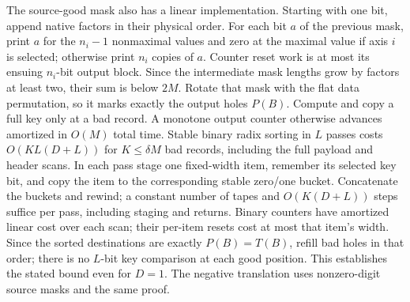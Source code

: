 The source-good mask also has a linear implementation. Starting with
one bit, append native factors in their physical order. For each bit
$a$ of the previous mask, print $a$ for the $n_i-1$ nonmaximal values
and zero at the maximal value if axis $i$ is selected; otherwise
print $n_i$ copies of $a$. Counter reset work is at most its ensuing
$n_i$-bit output block. Since the intermediate mask lengths grow by
factors at least two, their sum is below $2M$. Rotate that mask with
the flat data permutation, so it marks exactly the output holes $P(B)$.
Compute and copy a full key only at a bad record. A monotone output
counter otherwise advances amortized in $O(M)$ total time. Stable
binary radix sorting in $L$ passes costs
$O(KL(D+L))$ for $K\le\delta M$ bad records, including the full
payload and header scans. In each pass stage one fixed-width item,
remember its selected key bit, and copy the item to the corresponding
stable zero/one bucket. Concatenate the buckets and rewind; a constant
number of tapes and $O(K(D+L))$ steps suffice per pass, including
staging and returns. Binary counters have amortized linear cost over
each scan; their per-item resets cost at most that item's width.
Since the sorted destinations are exactly
$P(B)=T(B)$, refill bad holes in that order; there is no $L$-bit key
comparison at each good position. This establishes the stated bound
even for $D=1$. The negative translation uses nonzero-digit source
masks and the same proof.

